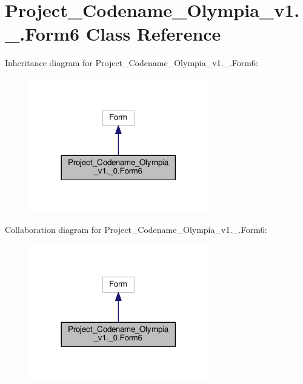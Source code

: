 \hypertarget{classProject__Codename__Olympia__v1_1_1__0_1_1Form6}{}\section{Project\+\_\+\+Codename\+\_\+\+Olympia\+\_\+v1.\+\_.\+Form6 Class Reference}
\label{classProject__Codename__Olympia__v1_1_1__0_1_1Form6}


Inheritance diagram for Project\+\_\+\+Codename\+\_\+\+Olympia\+\_\+v1.\+\_.\+Form6\+:
\nopagebreak
\begin{figure}[H]
\begin{center}
\leavevmode
\includegraphics[width=221pt]{classProject__Codename__Olympia__v1_1_1__0_1_1Form6__inherit__graph}
\end{center}
\end{figure}


Collaboration diagram for Project\+\_\+\+Codename\+\_\+\+Olympia\+\_\+v1.\+\_.\+Form6\+:
\nopagebreak
\begin{figure}[H]
\begin{center}
\leavevmode
\includegraphics[width=221pt]{classProject__Codename__Olympia__v1_1_1__0_1_1Form6__coll__graph}
\end{center}
\end{figure}
